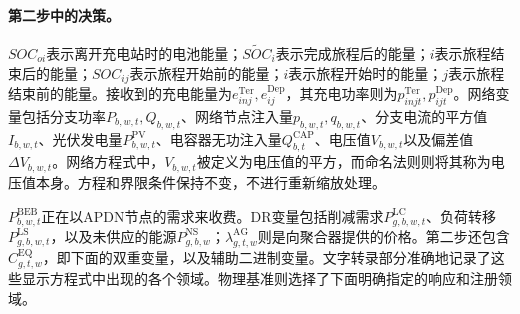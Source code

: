 \documentclass{article}
\begin{document}
\paragraph{第二步中的决策。}
\(SOC_{oi}\)表示离开充电站时的电池能量；\(\widetilde{SOC}_i\)表示完成旅程后的能量；\(i\)表示旅程结束后的能量；\(SOC_{ij}\)表示旅程开始前的能量；\(i\)表示旅程开始时的能量；\(j\)表示旅程结束前的能量。接收到的充电能量为\(e^{\mathrm{Ter}}_{inj},e^{\mathrm{Dep}}_{ij}\)，其充电功率则为\(p^{\mathrm{Ter}}_{injt},p^{\mathrm{Dep}}_{ijt}\)。网络变量包括分支功率\(P_{b,w,t},Q_{b,w,t}\)、网络节点注入量\(p_{b,w,t},q_{b,w,t}\)、分支电流的平方值\(I_{b,w,t}\)、光伏发电量\(P^{\mathrm{PV}}_{b,w,t}\)、电容器无功注入量\(Q^{\mathrm{CAP}}_{b,t}\)、电压值\(V_{b,w,t}\)以及偏差值\(\Delta V_{b,w,t}\)。网络方程式中，\(V_{b,w,t}\)被定义为电压值的平方，而命名法则则将其称为电压值本身。方程和界限条件保持不变，不进行重新缩放处理。

\(P^{\mathrm{BEB}}_{b,w,t}\)正在以APDN节点的需求来收费。DR变量包括削减需求\(P^{\mathrm{LC}}_{g,b,w,t}\)、负荷转移\(P^{\mathrm{LS}}_{g,b,w,t}\)，以及未供应的能源\(P^{\mathrm{NS}}_{g,b,w}\)；\(\lambda^{\mathrm{AG}}_{g,t,w}\)则是向聚合器提供的价格。第二步还包含\(C^{\mathrm{EQ}}_{g,t,w}\)，即下面的双重变量，以及辅助二进制变量。文字转录部分准确地记录了这些显示方程式中出现的各个领域。物理基准则选择了下面明确指定的响应和注册领域。
\end{document}
